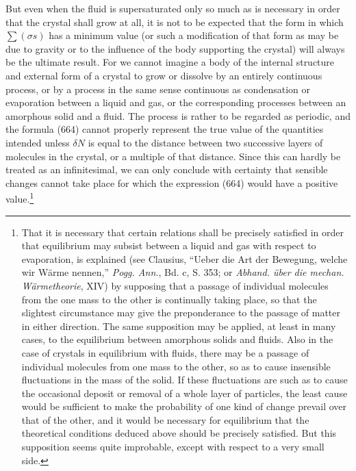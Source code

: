 \documentclass[12pt]{memoir}
\newcommand{\dd}{\delta}
\begin{document}
But even when the fluid is supersaturated only so much as is necessary in order that the crystal shall grow at all, it is not to be expected that the form in which $\sum(\sigma s)$ has a minimum value (or such a modification of that form as may be due to gravity or to the influence of the body supporting the crystal) will always be the ultimate result. For we cannot imagine a body of the internal structure and external form of a crystal to grow or dissolve by an entirely continuous process, or by a process in the same sense continuous as condensation or evaporation between a liquid and gas, or the corresponding processes between an amorphous solid and a fluid. The process is rather to be regarded as periodic, and the formula (664) cannot properly represent the true value of the quantities intended unless $\dd N$ is equal to the distance between two successive layers of molecules in the crystal, or a multiple of that distance. Since this can hardly be treated as an infinitesimal, we can only conclude with certainty that sensible changes cannot take place for which the expression (664) would have a positive value.\footnote{That it is necessary that certain relations shall be precisely satisfied in order that equilibrium may subsist between a liquid and gas with respect to evaporation, is explained (see Clausius, ``Ueber die Art der Bewegung, welche wir W\"{a}rme nennen,'' \textit{Pogg. Ann.}, Bd. c, S. 353; or \textit{Abhand. \"{u}ber die mechan. W\"{a}rmetheorie}, XIV) by supposing that a passage of individual molecules from the one mass to the other is continually taking place, so that the slightest circumstance may give the preponderance to the passage of matter in either direction.  The same supposition may be applied, at least in many cases, to the equilibrium between amorphous solids and fluids. Also in the case of crystals in equilibrium with fluids, there may be a passage of individual molecules from one mass to the other, so as to cause insensible fluctuations in the mass of the solid. If these fluctuations are such as to cause the occasional deposit or removal of a whole layer of particles, the least cause would be sufficient to make the probability of one kind of change prevail over that of the other, and it would be necessary for equilibrium that the theoretical conditions deduced above should be precisely satisfied. But this supposition seems quite improbable, except with respect to a very small side.\par
}
\end{document}
